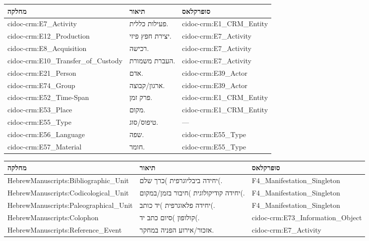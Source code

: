 \documentclass[12pt,a4paper]{article}
\begin{document}
{\small
\begin{longtable}{|p{4.5cm}|p{8.5cm}|p{3cm}|}
\hline
\textbf{מחלקה} & \textbf{תיאור} & \textbf{סופרקלאס} \\
\hline
\endhead

\textenglish{cidoc-crm:E7\_Activity} & פעילות כללית. & \textenglish{cidoc-crm:E1\_CRM\_Entity} \\
\hline
\textenglish{cidoc-crm:E12\_Production} & יצירת חפץ פיזי. & \textenglish{cidoc-crm:E7\_Activity} \\
\hline
\textenglish{cidoc-crm:E8\_Acquisition} & רכישה. & \textenglish{cidoc-crm:E7\_Activity} \\
\hline
\textenglish{cidoc-crm:E10\_Transfer\_of\_Custody} & העברת משמורת. & \textenglish{cidoc-crm:E7\_Activity} \\
\hline
\textenglish{cidoc-crm:E21\_Person} & אדם. & \textenglish{cidoc-crm:E39\_Actor} \\
\hline
\textenglish{cidoc-crm:E74\_Group} & ארגון/קבוצה. & \textenglish{cidoc-crm:E39\_Actor} \\
\hline
\textenglish{cidoc-crm:E52\_Time-Span} & פרק זמן. & \textenglish{cidoc-crm:E1\_CRM\_Entity} \\
\hline
\textenglish{cidoc-crm:E53\_Place} & מקום. & \textenglish{cidoc-crm:E1\_CRM\_Entity} \\
\hline
\textenglish{cidoc-crm:E55\_Type} & טיפוס/סוג. & — \\
\hline
\textenglish{cidoc-crm:E56\_Language} & שפה. & \textenglish{cidoc-crm:E55\_Type} \\
\hline
\textenglish{cidoc-crm:E57\_Material} & חומר. & \textenglish{cidoc-crm:E55\_Type} \\
\hline
\end{longtable}
}

{\small
\begin{longtable}{|p{4.5cm}|p{8.5cm}|p{3cm}|}
\hline
\textbf{מחלקה} & \textbf{תיאור} & \textbf{סופרקלאס} \\
\hline
\endhead

\textenglish{HebrewManuscripts:Bibliographic\_Unit} & יחידה ביבליוגרפית )כרך שלם(. & \textenglish{F4\_Manifestation\_Singleton} \\
\hline
\textenglish{HebrewManuscripts:Codicological\_Unit} & יחידה קודיקולוגית )חיבור בזמן/במקום(. & \textenglish{F4\_Manifestation\_Singleton} \\
\hline
\textenglish{HebrewManuscripts:Paleographical\_Unit} & יחידה פלאוגרפית )יד כותב(. & \textenglish{F4\_Manifestation\_Singleton} \\
\hline
\textenglish{HebrewManuscripts:Colophon} & קולופון )סיום כתב יד(. & \textenglish{cidoc-crm:E73\_Information\_Object} \\
\hline
\textenglish{HebrewManuscripts:Reference\_Event} & אזכור/אירוע הפניה במחקר. & \textenglish{cidoc-crm:E7\_Activity} \\
\hline
\end{longtable}
}
\end{document}
